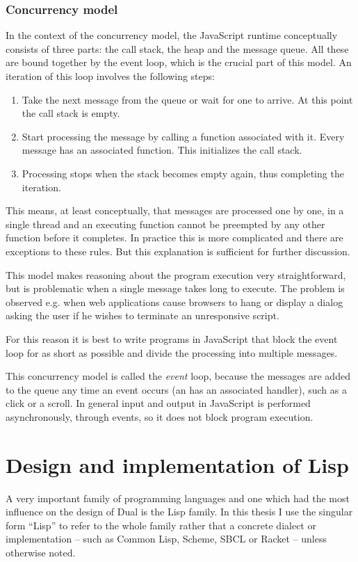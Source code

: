\subsubsection{Concurrency model}
In the context of the concurrency model, the JavaScript runtime conceptually
consists of three parts: the call stack, the heap and the message queue. All
these are bound together by the event loop\cite{mdn_concurrency}, which is the crucial part of this model.  An iteration of this loop involves the following steps:
\begin{enumerate}
	\item Take the next message from the queue or wait for one to arrive. At
          this point the call stack is empty.
	\item Start processing the message by calling a function associated with
          it. Every message has an associated function. This initializes the
          call stack.
	\item Processing stops when the stack becomes empty again, thus
          completing the iteration.
\end{enumerate}

This means, at least conceptually, that messages are processed one by one, in a single thread and an executing function cannot be preempted by any other function before it completes. In practice this is more complicated and there are exceptions to these rules. But this explanation is sufficient for further discussion.

This model makes reasoning about the program execution very straightforward, but
is problematic when a single message takes long to execute. The problem is
observed e.g. when web applications cause browsers to hang or display a
dialog asking the user if he wishes to terminate an unresponsive script.

For this reason it is best to write programs in JavaScript that block the event
loop for as short as possible and divide the processing into multiple messages.

This concurrency model is called the \textit{event} loop, because the messages are added to the queue any time an event occurs (an has an associated handler), such as a click or a scroll. In general input and output in JavaScript is performed asynchronously, through events, so it does not block program execution.

\section{Design and implementation of Lisp}\label{sec:lisp}
A very important family of programming languages and one which had the most
influence on the design of Dual is the Lisp family. In this thesis I use the
singular form ``Lisp'' to refer to the whole family rather that a concrete
dialect or implementation -- such as Common Lisp\cite{common_lisp_hyperspec}, Scheme\cite{r7rs}, SBCL\cite{sbcl_site} or Racket\cite{racket_site} -- unless otherwise noted.

